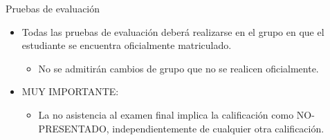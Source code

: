 \begin{frame}[t]{Pruebas de evaluación}
\begin{itemize}
  \item Todas las pruebas de evaluación deberá realizarse en el grupo en que el estudiante se encuentra oficialmente matriculado.
    \begin{itemize}
      \item No se admitirán cambios de grupo que no se realicen oficialmente.
    \end{itemize}
  \item \alert{MUY IMPORTANTE}:
    
\begin{itemize}
      \item La no asistencia al examen final implica la calificación como NO-PRESENTADO, independientemente de cualquier otra calificación.
    \end{itemize}
\end{itemize}
\end{frame}
